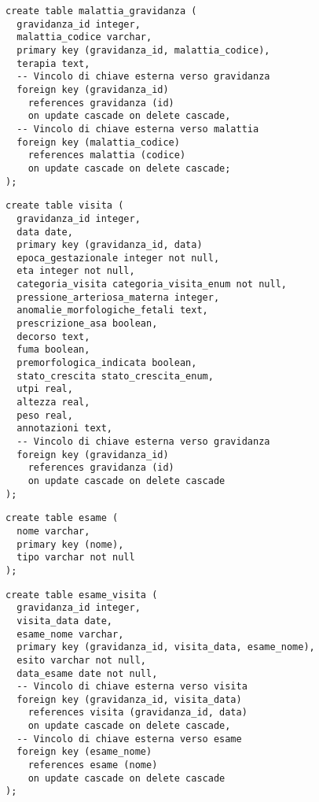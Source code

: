 \begin{lstlisting}[float,caption={Definizione della tabella \tab{malattia\_gravidanza}.},label=ptabmalattiagravidanza]
create table malattia_gravidanza (
  gravidanza_id integer,
  malattia_codice varchar,
  primary key (gravidanza_id, malattia_codice),
  terapia text,
  -- Vincolo di chiave esterna verso gravidanza
  foreign key (gravidanza_id)
    references gravidanza (id)
    on update cascade on delete cascade,
  -- Vincolo di chiave esterna verso malattia
  foreign key (malattia_codice)
    references malattia (codice)
    on update cascade on delete cascade;
);
\end{lstlisting}

\begin{lstlisting}[float,caption={Definizione della tabella \tab{visita}.},label=ptabvisita]
create table visita (
  gravidanza_id integer,
  data date,
  primary key (gravidanza_id, data)
  epoca_gestazionale integer not null,
  eta integer not null,
  categoria_visita categoria_visita_enum not null,
  pressione_arteriosa_materna integer,
  anomalie_morfologiche_fetali text,
  prescrizione_asa boolean,
  decorso text,
  fuma boolean,
  premorfologica_indicata boolean,
  stato_crescita stato_crescita_enum,
  utpi real,
  altezza real,
  peso real,
  annotazioni text,
  -- Vincolo di chiave esterna verso gravidanza
  foreign key (gravidanza_id)
    references gravidanza (id)
    on update cascade on delete cascade
);
\end{lstlisting}

\begin{lstlisting}[float,caption={Definizione della tabella \tab{esame}.},label=ptabesame]
create table esame (
  nome varchar,
  primary key (nome),
  tipo varchar not null
);
\end{lstlisting}

\begin{lstlisting}[float,caption={Definizione della tabella \tab{esame\_visita}.},label=ptabesamevisita]
create table esame_visita (
  gravidanza_id integer,
  visita_data date,
  esame_nome varchar,
  primary key (gravidanza_id, visita_data, esame_nome),
  esito varchar not null,
  data_esame date not null,
  -- Vincolo di chiave esterna verso visita
  foreign key (gravidanza_id, visita_data)
    references visita (gravidanza_id, data)
    on update cascade on delete cascade,
  -- Vincolo di chiave esterna verso esame
  foreign key (esame_nome)
    references esame (nome)
    on update cascade on delete cascade
);
\end{lstlisting}

